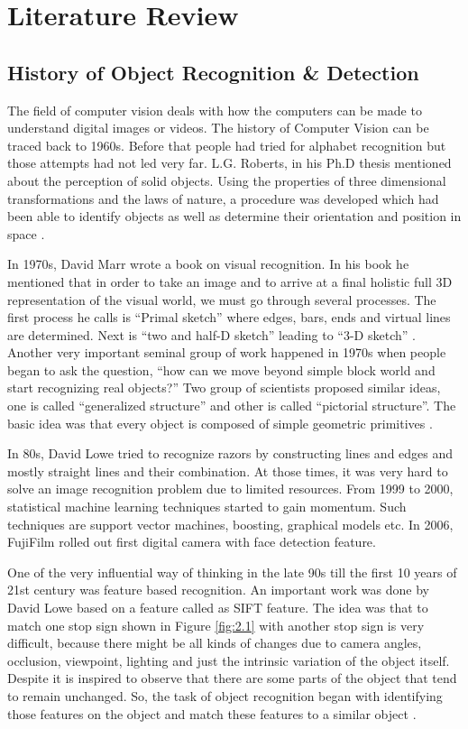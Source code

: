 \chapter{Literature Review}
\label{Chapter 2}

\section{History of Object Recognition \& Detection}

The field of computer vision deals with how the computers can be made to understand digital images or videos. 
The history of Computer Vision can be traced back to 1960s. Before that people had tried for alphabet recognition 
but those attempts had not led very far. L.G. Roberts, in his Ph.D thesis mentioned about the perception 
of solid objects. Using the properties of three dimensional transformations and the laws of nature, a procedure 
was developed which had been able to identify objects as well as determine their orientation and position in space \cite{chap_2_article:1}. 

In 1970s, David Marr wrote a book on visual recognition. In his book he mentioned that in order to take an 
image and to arrive at a final holistic full 3D representation of the visual world, we must go through 
several processes. The first process he calls is “Primal sketch” where edges, bars, ends and virtual lines 
are determined. Next is “two and half-D sketch” leading to “3-D sketch”  \cite{chap_2_article:2}. Another very important seminal 
group of work happened in 1970s when people began to ask the question, “how can we move beyond simple block 
world and start recognizing real objects?” Two group of scientists proposed similar ideas, one 
is called “generalized structure” and other is called “pictorial structure”. The basic idea was that 
every object is composed of simple geometric primitives \cite{chap_2_article:3}. 

In 80s, David Lowe tried to recognize razors by constructing lines and edges and mostly straight lines 
and their combination. At those times, it was very hard to solve an image recognition problem due to 
limited resources. From 1999 to 2000, statistical machine learning techniques started to gain momentum. Such 
techniques are support vector machines, boosting, graphical models etc. In 2006, FujiFilm rolled out first 
digital camera with face detection feature.

One of the very influential way of thinking in the late 90s till the first 10 years of 21st century was feature 
based recognition. An important work was done by David Lowe based on a feature called as SIFT feature. The idea 
was that to match one stop sign shown in Figure \ref{fig:2.1} with another stop sign is very difficult, because there might 
be all kinds of changes due to camera angles, occlusion, viewpoint, lighting and just the intrinsic variation of 
the object itself. Despite it is inspired to observe that there are some parts of the object that tend to remain 
unchanged. So, the task of object recognition began with identifying those features on the object and match these 
features to a similar object \cite{chap_2_article:4}.

